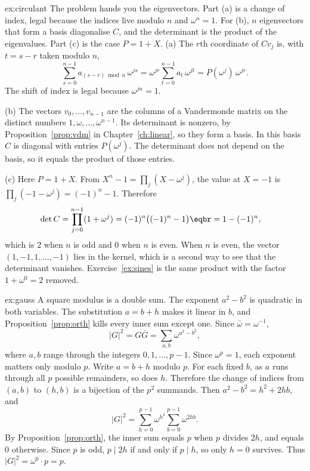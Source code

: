 \begin{solution}{ex:circulant}
\idea The problem hands you the eigenvectors. Part (a) is a change of index, legal because the indices live modulo $n$ and $\omega^n=1$. For (b), $n$ eigenvectors that form a basis diagonalise $C$, and the determinant is the product of the eigenvalues. Part (c) is the case $P=1+X$.
\writeup (a) The $r$th coordinate of $Cv_j$ is, with $t=s-r$ taken modulo $n$,
\[
\sum_{s=0}^{n-1}a_{(s-r)\bmod n}\,\omega^{js}=\omega^{jr}\sum_{t=0}^{n-1}a_t\,\omega^{jt}=P(\omega^j)\,\omega^{jr}.
\]
The shift of index is legal because $\omega^{jn}=1$.

(b) The vectors $v_0,\dots,v_{n-1}$ are the columns of a Vandermonde matrix on the distinct numbers $1,\omega,\dots,\omega^{n-1}$. Its determinant is nonzero, by Proposition~\ref{prop:vdm} in Chapter~\ref{ch:linear}, so they form a basis. In this basis $C$ is diagonal with entries $P(\omega^j)$. The determinant does not depend on the basis, so it equals the product of those entries.

(c) Here $P=1+X$. From $X^n-1=\prod_j(X-\omega^j)$, the value at $X=-1$ is $\prod_j(-1-\omega^j)=(-1)^n-1$. Therefore
\begin{align*}
\det C&=\prod_{j=0}^{n-1}(1+\omega^j)=(-1)^n\bigl((-1)^n-1\bigr)\eqbr=1-(-1)^n,
\end{align*}
which is $2$ when $n$ is odd and $0$ when $n$ is even. When $n$ is even, the vector $(1,-1,1,\dots,-1)$ lies in the kernel, which is a second way to see that the determinant vanishes. Exercise~\ref{ex:sines} is the same product with the factor $1+\omega^0=2$ removed.
\end{solution}

\begin{solution}{ex:gauss}
\idea A square modulus is a double sum. The exponent $a^2-b^2$ is quadratic in both variables. The substitution $a=b+h$ makes it linear in $b$, and Proposition~\ref{prop:orth} kills every inner sum except one.
\writeup Since $\bar\omega=\omega^{-1}$,
\[
|G|^2=G\bar G=\sum_{a,b}\omega^{a^2-b^2},
\]
where $a,b$ range through the integers $0,1,\dots,p-1$. Since $\omega^p=1$, each exponent matters only modulo $p$. Write $a=b+h$ modulo $p$. For each fixed $b$, as $a$ runs through all $p$ possible remainders, so does $h$. Therefore the change of indices from $(a,b)$ to $(h,b)$ is a bijection of the $p^2$ summands. Then $a^2-b^2=h^2+2hb$, and
\[
|G|^2=\sum_{h=0}^{p-1}\omega^{h^2}\sum_{b=0}^{p-1}\omega^{2hb}.
\]
By Proposition~\ref{prop:orth}, the inner sum equals $p$ when $p$ divides $2h$, and equals $0$ otherwise. Since $p$ is odd, $p\mid2h$ if and only if $p\mid h$, so only $h=0$ survives. Thus $|G|^2=\omega^0\cdot p=p$.
\end{solution}

